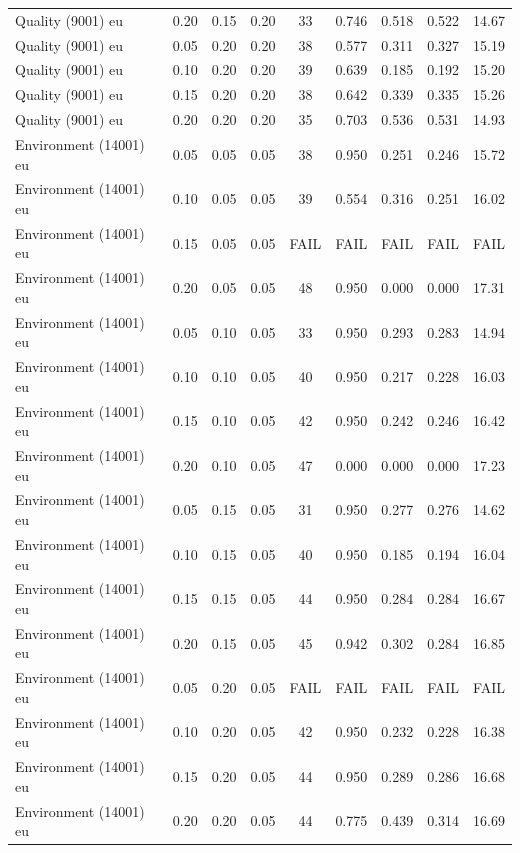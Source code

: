 \begin{longtable}[t]{lrrrccccc}
Quality (9001) eu & 0.20 & 0.15 & 0.20 & 33 & 0.746 & 0.518 & 0.522 & 14.67\\
\addlinespace
Quality (9001) eu & 0.05 & 0.20 & 0.20 & 38 & 0.577 & 0.311 & 0.327 & 15.19\\
Quality (9001) eu & 0.10 & 0.20 & 0.20 & 39 & 0.639 & 0.185 & 0.192 & 15.20\\
Quality (9001) eu & 0.15 & 0.20 & 0.20 & 38 & 0.642 & 0.339 & 0.335 & 15.26\\
Quality (9001) eu & 0.20 & 0.20 & 0.20 & 35 & 0.703 & 0.536 & 0.531 & 14.93\\
Environment (14001) eu & 0.05 & 0.05 & 0.05 & 38 & 0.950 & 0.251 & 0.246 & 15.72\\
\addlinespace
Environment (14001) eu & 0.10 & 0.05 & 0.05 & 39 & 0.554 & 0.316 & 0.251 & 16.02\\
Environment (14001) eu & 0.15 & 0.05 & 0.05 & FAIL & FAIL & FAIL & FAIL & FAIL\\
Environment (14001) eu & 0.20 & 0.05 & 0.05 & 48 & 0.950 & 0.000 & 0.000 & 17.31\\
Environment (14001) eu & 0.05 & 0.10 & 0.05 & 33 & 0.950 & 0.293 & 0.283 & 14.94\\
Environment (14001) eu & 0.10 & 0.10 & 0.05 & 40 & 0.950 & 0.217 & 0.228 & 16.03\\
\addlinespace
Environment (14001) eu & 0.15 & 0.10 & 0.05 & 42 & 0.950 & 0.242 & 0.246 & 16.42\\
Environment (14001) eu & 0.20 & 0.10 & 0.05 & 47 & 0.000 & 0.000 & 0.000 & 17.23\\
Environment (14001) eu & 0.05 & 0.15 & 0.05 & 31 & 0.950 & 0.277 & 0.276 & 14.62\\
Environment (14001) eu & 0.10 & 0.15 & 0.05 & 40 & 0.950 & 0.185 & 0.194 & 16.04\\
Environment (14001) eu & 0.15 & 0.15 & 0.05 & 44 & 0.950 & 0.284 & 0.284 & 16.67\\
\addlinespace
Environment (14001) eu & 0.20 & 0.15 & 0.05 & 45 & 0.942 & 0.302 & 0.284 & 16.85\\
Environment (14001) eu & 0.05 & 0.20 & 0.05 & FAIL & FAIL & FAIL & FAIL & FAIL\\
Environment (14001) eu & 0.10 & 0.20 & 0.05 & 42 & 0.950 & 0.232 & 0.228 & 16.38\\
Environment (14001) eu & 0.15 & 0.20 & 0.05 & 44 & 0.950 & 0.289 & 0.286 & 16.68\\
Environment (14001) eu & 0.20 & 0.20 & 0.05 & 44 & 0.775 & 0.439 & 0.314 & 16.69\\

\end{longtable}
